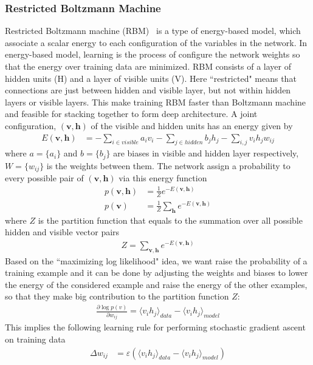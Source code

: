 \subsubsection{Restricted Boltzmann Machine}
Restricted Boltzmann machine (RBM)~\cite{RBMTechReport} is a type of energy-based model,
which associate a scalar energy to each configuration of the variables in the network.
In energy-based model, learning is the process of configure the network weights so that
the energy over training data are minimized.
RBM consists of a layer of hidden units (H) and a layer of visible units (V).
Here ``restricted" means that connections are just between hidden and visible layer,
but not within hidden layers or visible layers.
This make training RBM faster than Boltzmann machine and feasible for stacking together
to form deep architecture.
A joint configuration, $(\mathbf{v, h})$ of the visible and hidden units has an energy given by
\begin{align}
    E(\mathbf{v, h}) &= -\sum_{i\in visible}a_i v_i - \sum_{j\in hidden}b_j h_j - \sum_{i, j}v_i h_j w_{ij}
\end{align}
where $a=\{a_i\}$ and $b=\{b_j\}$ are biases in visible and hidden layer respectively,
$W=\{w_{ij}\}$ is the weights between them.
The network assign a probability to every possible pair of $(\mathbf{v, h})$ via this energy
function
\begin{align}
    p(\mathbf{v, h}) &= \frac{1}{Z} e^{-E(\mathbf{v, h})} \\
    p(\mathbf{v}) &= \frac{1}{Z} \sum_{\mathbf{h}} e^{-E(\mathbf{v, h})}
\end{align}
where $Z$ is the partition function that equals to the summation over all possible hidden
and visible vector pairs
\begin{align}
    Z = \sum_{\mathbf{v,h}} e^{-E(\mathbf{v, h})}
\end{align}
Based on the ``maximizing log likelihood" idea,
we want raise the probability of a training example and it can be done by
adjusting the weights and biases to lower the energy of the considered
example and raise the energy of the other examples, so that they make big contribution to
the partition function $Z$:
\begin{align}
    \frac{\partial \log p(v)}{\partial w_{ij}} = \langle v_i h_j \rangle_{data} - \langle v_i h_j \rangle_{model} 
\end{align}
This implies the following learning rule for performing stochastic gradient ascent on training
data
\begin{align}
    \Delta w_{ij} &= \varepsilon (\langle v_i h_j \rangle_{data} - \langle v_i h_j \rangle_{model})
\end{align}
